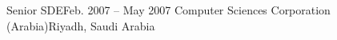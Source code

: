\resumeSubheading
{Senior SDE}{Feb. 2007 -- May 2007}
{Computer Sciences Corporation (Arabia)}{Riyadh, Saudi Arabia}
\resumeItemListStart
\resumeItemListEnd